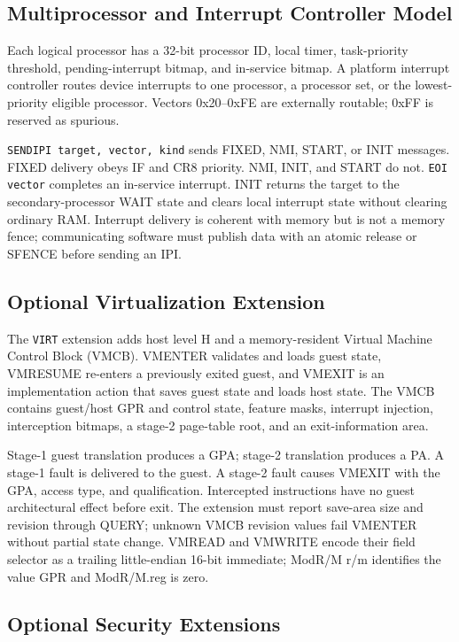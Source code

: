\documentclass[11pt]{article}
\begin{document}
\subsection{Multiprocessor and Interrupt Controller Model}

Each logical processor has a 32-bit processor ID, local timer, task-priority threshold, pending-interrupt bitmap, and in-service bitmap. A platform interrupt controller routes device interrupts to one processor, a processor set, or the lowest-priority eligible processor. Vectors 0x20--0xFE are externally routable; 0xFF is reserved as spurious.

\texttt{SENDIPI target, vector, kind} sends FIXED, NMI, START, or INIT messages. FIXED delivery obeys IF and CR8 priority. NMI, INIT, and START do not. \texttt{EOI vector} completes an in-service interrupt. INIT returns the target to the secondary-processor WAIT state and clears local interrupt state without clearing ordinary RAM. Interrupt delivery is coherent with memory but is not a memory fence; communicating software must publish data with an atomic release or SFENCE before sending an IPI.

\subsection{Optional Virtualization Extension}

The \texttt{VIRT} extension adds host level H and a memory-resident Virtual Machine Control Block (VMCB). VMENTER validates and loads guest state, VMRESUME re-enters a previously exited guest, and VMEXIT is an implementation action that saves guest state and loads host state. The VMCB contains guest/host GPR and control state, feature masks, interrupt injection, interception bitmaps, a stage-2 page-table root, and an exit-information area.

Stage-1 guest translation produces a GPA; stage-2 translation produces a PA. A stage-1 fault is delivered to the guest. A stage-2 fault causes VMEXIT with the GPA, access type, and qualification. Intercepted instructions have no guest architectural effect before exit. The extension must report save-area size and revision through QUERY; unknown VMCB revision values fail VMENTER without partial state change. VMREAD and VMWRITE encode their field selector as a trailing little-endian 16-bit immediate; ModR/M r/m identifies the value GPR and ModR/M.reg is zero.

\subsection{Optional Security Extensions}
\end{document}
